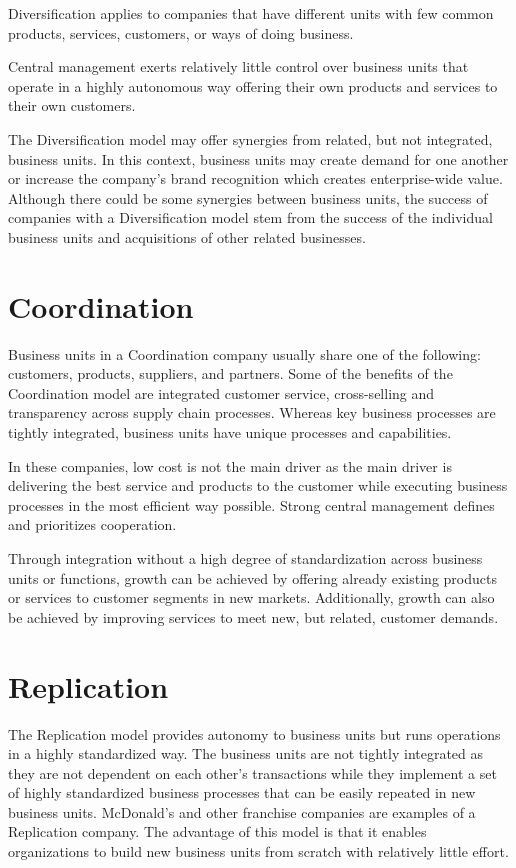 Diversification applies to companies that have different units with few common products, services, customers,
or ways of doing business.

Central management exerts relatively little control over business units that operate in a highly autonomous way
offering their own products and services to their own customers.

The Diversification model may offer synergies from related, but not integrated, business units.
In this context, business units may create demand for one another or increase the company’s brand recognition
which creates enterprise-wide value.
Although there could be some synergies between business units, the success of companies with a Diversification model
stem from the success of the individual business units and acquisitions of other related businesses.

\section*{Coordination}

Business units in a Coordination company usually share one of the following:
customers, products, suppliers, and partners.
Some of the benefits of the Coordination model are integrated customer service,
cross-selling and transparency across supply chain processes.
Whereas key business processes are tightly integrated, business units have unique processes and capabilities.

In these companies, low cost is not the main driver as the main driver is delivering the best service and products
to the customer while executing business processes in the most efficient way possible.
Strong central management defines and prioritizes cooperation.

Through integration without a high degree of standardization across business units or functions,
growth can be achieved by offering already existing products or services to customer segments in new markets.
Additionally, growth can also be achieved by improving services to meet new, but related, customer demands.

\section*{Replication}

The Replication model provides autonomy to business units but runs operations in a highly standardized way.
The business units are not tightly integrated as they are not dependent on each other’s transactions while they
implement a set of highly standardized business processes that can be easily repeated in new business units.
McDonald’s and other franchise companies are examples of a Replication company.
The advantage of this model is that it enables organizations to build new business units from scratch
with relatively little effort.

